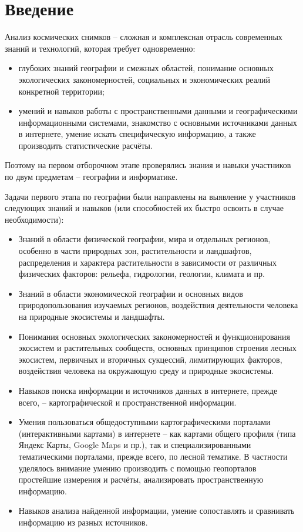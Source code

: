 

\section*{Введение}

Анализ космических снимков – сложная и комплексная отрасль современных знаний и технологий, которая требует одновременно:
\begin{itemize}
    \item глубоких знаний географии и смежных областей, понимание основных экологических закономерностей, социальных и экономических реалий конкретной территории; 
    \item умений и навыков работы с пространственными данными и географическими информационными системами, знакомство с основными источниками данных в интернете, умение искать специфическую информацию, а также производить статистические расчёты.
\end{itemize}

Поэтому на первом отборочном этапе проверялись знания и навыки участников по двум предметам – географии и информатике. 

Задачи первого этапа по географии были направлены на выявление у участников следующих знаний и навыков (или способностей их быстро освоить в случае необходимости):
\begin{itemize}
    \item Знаний в области физической географии, мира и отдельных регионов, особенно в части природных зон, растительности и ландшафтов, распределения и характера растительности в зависимости от различных физических факторов: рельефа, гидрологии, геологии, климата и пр.
    \item Знаний в области экономической географии и основных видов природопользования изучаемых регионов, воздействия деятельности человека на природные экосистемы и ландшафты.
    \item Понимания основных экологических закономерностей и функционирования экосистем и растительных сообществ, основных принципов строения лесных экосистем, первичных и вторичных сукцессий, лимитирующих факторов, воздействия человека на окружающую среду и природные экосистемы.
    \item Навыков поиска информации и источников данных в интернете, прежде всего, – картографической и пространственной информации.
    \item Умения пользоваться общедоступными картографическими порталами (интерактивными картами) в интернете – как картами общего профиля (типа Яндекс Карты, Google Maps и пр.), так и специализированными тематическими порталами, прежде всего, по лесной тематике. В частности уделялось внимание умению производить с помощью геопорталов простейшие измерения и расчёты, анализировать пространственную информацию.
    \item Навыков анализа найденной информации, умение сопоставлять и сравнивать информацию из разных источников.
\end{itemize}

